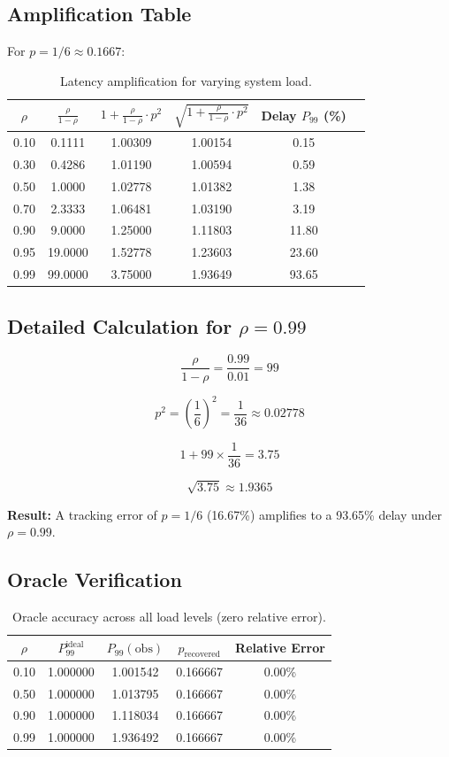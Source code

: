\documentclass[11pt]{article}
\begin{document}
\subsection{Amplification Table}

For $p = 1/6 \approx 0.1667$:

\begin{table}[h]
\centering
\caption{Latency amplification for varying system load.}
\label{tab:amplification}
\begin{tabular}{@{}cccccc@{}}
\toprule
$\rho$ & $\frac{\rho}{1-\rho}$ & $1 + \frac{\rho}{1-\rho} \cdot p^2$ & $\sqrt{1 + \frac{\rho}{1-\rho} \cdot p^2}$ & Delay $P_{99}$ (\%) \\
\midrule
0.10 & 0.1111 & 1.00309 & 1.00154 & 0.15 \\
0.30 & 0.4286 & 1.01190 & 1.00594 & 0.59 \\
0.50 & 1.0000 & 1.02778 & 1.01382 & 1.38 \\
0.70 & 2.3333 & 1.06481 & 1.03190 & 3.19 \\
0.90 & 9.0000 & 1.25000 & 1.11803 & 11.80 \\
0.95 & 19.0000 & 1.52778 & 1.23603 & 23.60 \\
0.99 & 99.0000 & 3.75000 & 1.93649 & 93.65 \\
\bottomrule
\end{tabular}
\end{table}

\subsection{Detailed Calculation for $\rho = 0.99$}

$$\frac{\rho}{1-\rho} = \frac{0.99}{0.01} = 99$$

$$p^2 = \left(\frac{1}{6}\right)^2 = \frac{1}{36} \approx 0.02778$$

$$1 + 99 \times \frac{1}{36} = 3.75$$

$$\sqrt{3.75} \approx 1.9365$$

\textbf{Result:} A tracking error of $p = 1/6$ (16.67\%) amplifies to a 93.65\% delay under $\rho = 0.99$.

\subsection{Oracle Verification}

\begin{table}[h]
\centering
\caption{Oracle accuracy across all load levels (zero relative error).}
\label{tab:oracle}
\begin{tabular}{@{}ccccc@{}}
\toprule
$\rho$ & $P_{99}^{\text{ideal}}$ & $P_{99}(\text{obs})$ & $p_{\text{recovered}}$ & Relative Error \\
\midrule
0.10 & 1.000000 & 1.001542 & 0.166667 & 0.00\% \\
0.50 & 1.000000 & 1.013795 & 0.166667 & 0.00\% \\
0.90 & 1.000000 & 1.118034 & 0.166667 & 0.00\% \\
0.99 & 1.000000 & 1.936492 & 0.166667 & 0.00\% \\
\bottomrule
\end{tabular}
\end{table}
\end{document}
